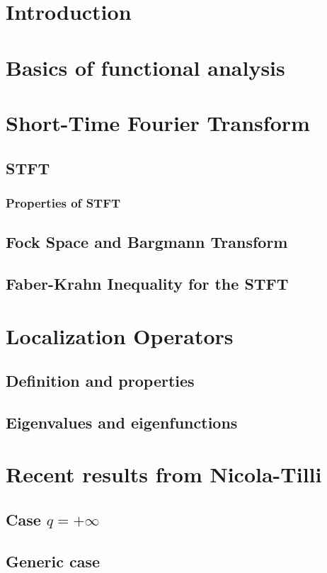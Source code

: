 \documentclass[corpo=11pt, stile=classica, tipotesi=custom,
greek, evenboxes]{toptesi}
\numberwithin{equation}{chapter}
\begin{document}
	


\sommario

\chapter{Introduction}

\chapter{Basics of functional analysis}

\chapter{Short-Time Fourier Transform}
\section{STFT}
\subsection{Properties of STFT}
\section{Fock Space and Bargmann Transform}
\section{Faber-Krahn Inequality for the STFT}


\chapter{Localization Operators}
\section{Definition and properties}
\section{Eigenvalues and eigenfunctions}

\chapter{Recent results from Nicola-Tilli}
\section{Case $q=+\infty$}
\section{Generic case}

\tableofcontents


\nocite{*}



	
\end{document}
